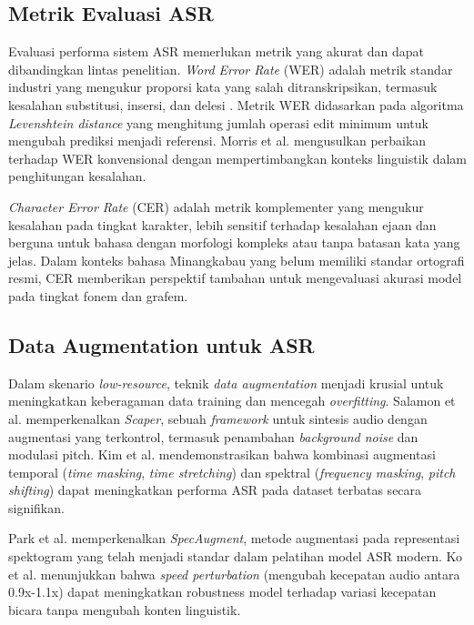 \subsection{Metrik Evaluasi ASR}

Evaluasi performa sistem ASR memerlukan metrik yang akurat dan dapat dibandingkan lintas penelitian. \textit{Word Error Rate} (WER) adalah metrik standar industri yang mengukur proporsi kata yang salah ditranskripsikan, termasuk kesalahan substitusi, insersi, dan delesi \cite{morris2004wer}. Metrik WER didasarkan pada algoritma \textit{Levenshtein distance} \cite{levenshtein1966distance} yang menghitung jumlah operasi edit minimum untuk mengubah prediksi menjadi referensi. Morris et al. \cite{morris2004wer} mengusulkan perbaikan terhadap WER konvensional dengan mempertimbangkan konteks linguistik dalam penghitungan kesalahan.

\textit{Character Error Rate} (CER) adalah metrik komplementer yang mengukur kesalahan pada tingkat karakter, lebih sensitif terhadap kesalahan ejaan dan berguna untuk bahasa dengan morfologi kompleks atau tanpa batasan kata yang jelas. Dalam konteks bahasa Minangkabau yang belum memiliki standar ortografi resmi, CER memberikan perspektif tambahan untuk mengevaluasi akurasi model pada tingkat fonem dan grafem.

\subsection{Data Augmentation untuk ASR}

Dalam skenario \textit{low-resource}, teknik \textit{data augmentation} menjadi krusial untuk meningkatkan keberagaman data training dan mencegah \textit{overfitting}. Salamon et al. \cite{salamon2017scaper} memperkenalkan \textit{Scaper}, sebuah \textit{framework} untuk sintesis audio dengan augmentasi yang terkontrol, termasuk penambahan \textit{background noise} dan modulasi pitch. Kim et al. \cite{kim2020augmentation} mendemonstrasikan bahwa kombinasi augmentasi temporal (\textit{time masking}, \textit{time stretching}) dan spektral (\textit{frequency masking}, \textit{pitch shifting}) dapat meningkatkan performa ASR pada dataset terbatas secara signifikan.

Park et al. \cite{park2019specaugment} memperkenalkan \textit{SpecAugment}, metode augmentasi pada representasi spektogram yang telah menjadi standar dalam pelatihan model ASR modern. Ko et al. \cite{ko2015audio} menunjukkan bahwa \textit{speed perturbation} (mengubah kecepatan audio antara 0.9x-1.1x) dapat meningkatkan robustness model terhadap variasi kecepatan bicara tanpa mengubah konten linguistik.

